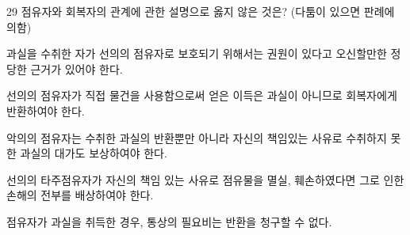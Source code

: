 \begin{question}{29}
점유자와 회복자의 관계에 관한 설명으로 옳지 않은 것은? (다툼이 있으면 판례에 의함)
\begin{choices}
  \item 과실을 수취한 자가 선의의 점유자로 보호되기 위해서는 권원이 있다고 오신할만한 정당한 근거가 있어야 한다.
  \item 선의의 점유자가 직접 물건을 사용함으로써 얻은 이득은 과실이 아니므로 회복자에게 반환하여야 한다.
  \item 악의의 점유자는 수취한 과실의 반환뿐만 아니라 자신의 책임있는 사유로 수취하지 못한 과실의 대가도 보상하여야 한다.
  \item 선의의 타주점유자가 자신의 책임 있는 사유로 점유물을 멸실, 훼손하였다면 그로 인한 손해의 전부를 배상하여야 한다.
  \item 점유자가 과실을 취득한 경우, 통상의 필요비는 반환을 청구할 수 없다.
\end{choices}
\end{question}
